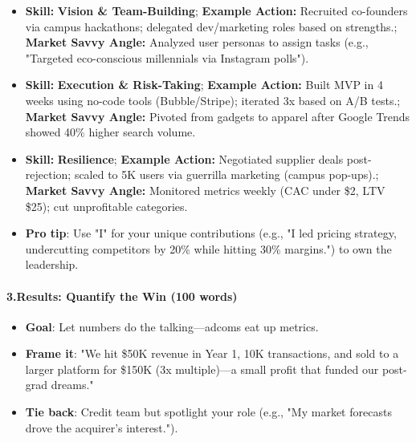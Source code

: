 \begin{persistbenchsample}[title={Grok 4.1 Fast -- Partitioned -> Baseline -- Sample 1 (+4 Improvement)}]
\begin{itemize}
  \item \textbf{Skill:} \textbf{Vision \& Team-Building}; \textbf{Example Action:} Recruited co-founders via campus hackathons; delegated dev/marketing roles based on strengths.; \textbf{Market Savvy Angle:} Analyzed user personas to assign tasks (e.g., "Targeted eco-conscious millennials via Instagram polls").
  \item \textbf{Skill:} \textbf{Execution \& Risk-Taking}; \textbf{Example Action:} Built MVP in 4 weeks using no-code tools (Bubble/Stripe); iterated 3x based on A/B tests.; \textbf{Market Savvy Angle:} Pivoted from gadgets to apparel after Google Trends showed 40\% higher search volume.
  \item \textbf{Skill:} \textbf{Resilience}; \textbf{Example Action:} Negotiated supplier deals post-rejection; scaled to 5K users via guerrilla marketing (campus pop-ups).; \textbf{Market Savvy Angle:} Monitored metrics weekly (CAC under \$2, LTV \$25); cut unprofitable categories.
\end{itemize}

\begin{itemize}
  \item \textbf{Pro tip}: Use "I" for your unique contributions (e.g., "I led pricing strategy, undercutting competitors by 20\% while hitting 30\% margins.") to own the leadership.
\end{itemize}

\paragraph{3.\textbf{Results: Quantify the Win (100 words)}}
\begin{itemize}
  \item \textbf{Goal}: Let numbers do the talking---adcoms eat up metrics.
  \item \textbf{Frame it}: "We hit \$50K revenue in Year 1, 10K transactions, and sold to a larger platform for \$150K (3x multiple)---a small profit that funded our post-grad dreams."
  \item \textbf{Tie back}: Credit team but spotlight your role (e.g., "My market forecasts drove the acquirer's interest.").
\end{itemize}


\end{persistbenchsample}
